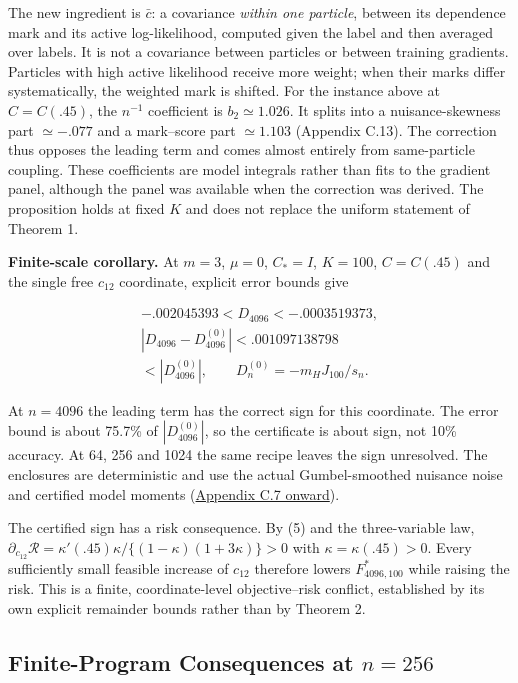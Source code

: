 \documentclass{article}
\begin{document}
The new ingredient is \(\bar c\): a covariance \emph{within one
particle}, between its dependence mark and its active log-likelihood,
computed given the label and then averaged over labels. It is not a
covariance between particles or between training gradients. Particles
with high active likelihood receive more weight; when their marks differ
systematically, the weighted mark is shifted. For the instance above at
\(C=C(.45)\), the \(n^{-1}\) coefficient is \(b_2\simeq1.026\). It
splits into a nuisance-skewness part \(\simeq-.077\) and a mark--score
part \(\simeq1.103\) (Appendix C.13). The correction thus opposes the
leading term and comes almost entirely from same-particle coupling.
These coefficients are model integrals rather than fits to the gradient
panel, although the panel was available when the correction was derived.
The proposition holds at fixed \(K\) and does not replace the uniform
statement of Theorem 1.

\protect{}\label{finite-direction-corollary}
\textbf{Finite-scale corollary.} At \(m=3\), \(\mu=0\), \(C_*=I\),
\(K=100\), \(C=C(.45)\) and the single free \(c_{12}\) coordinate,
explicit error bounds give

\[
\begin{gathered}
-.002045393<D_{4096}<-.0003519373,\\
|D_{4096}-D_{4096}^{(0)}|<.001097138798\\
<|D_{4096}^{(0)}|,\qquad
D_n^{(0)}=-m_HJ_{100}/s_n.
\end{gathered}
\tag{12}
\]

At \(n=4096\) the leading term has the correct sign for this coordinate.
The error bound is about 75.7\% of \(|D_{4096}^{(0)}|\), so the
certificate is about sign, not 10\% accuracy. At 64, 256 and 1024 the
same recipe leaves the sign unresolved. The enclosures are deterministic
and use the actual Gumbel-smoothed nuisance noise and certified model
moments (\hyperref[fixed-k-correction]{Appendix C.7 onward}).

The certified sign has a risk consequence. By (5) and the three-variable
law,
\(\partial_{c_{12}}\mathcal R=\kappa'(.45)\kappa/\{(1-\kappa)(1+3\kappa)\}>0\)
with \(\kappa=\kappa(.45)>0\). Every sufficiently small feasible
increase of \(c_{12}\) therefore lowers \(F^*_{4096,100}\) while raising
the risk. This is a finite, coordinate-level objective--risk conflict,
established by its own explicit remainder bounds rather than by Theorem
2.

\subsection{\texorpdfstring{Finite-Program Consequences at
\(n=256\)}{Finite-Program Consequences at n=256}}\label{finite-program-consequences-at-n256}
\end{document}
